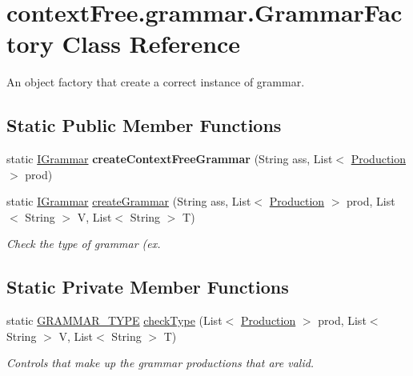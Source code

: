 \hypertarget{classcontext_free_1_1grammar_1_1_grammar_factory}{\section{context\-Free.\-grammar.\-Grammar\-Factory Class Reference}
\label{classcontext_free_1_1grammar_1_1_grammar_factory}
}


An object factory that create a correct instance of grammar.  


\subsection*{Static Public Member Functions}
\begin{DoxyCompactItemize}
\item 
\hypertarget{classcontext_free_1_1grammar_1_1_grammar_factory_a6829a8d168584b20ac594fae87de591a}{static \hyperlink{interfacecontext_free_1_1grammar_1_1_i_grammar}{I\-Grammar} {\bfseries create\-Context\-Free\-Grammar} (String ass, List$<$ \hyperlink{classcontext_free_1_1grammar_1_1_production}{Production} $>$ prod)}\label{classcontext_free_1_1grammar_1_1_grammar_factory_a6829a8d168584b20ac594fae87de591a}

\item 
static \hyperlink{interfacecontext_free_1_1grammar_1_1_i_grammar}{I\-Grammar} \hyperlink{classcontext_free_1_1grammar_1_1_grammar_factory_a25d4e5bf4a9a452efca5dd6518e16c25}{create\-Grammar} (String ass, List$<$ \hyperlink{classcontext_free_1_1grammar_1_1_production}{Production} $>$ prod, List$<$ String $>$ V, List$<$ String $>$ T)
\begin{DoxyCompactList}\small\item\em Check the type of grammar (ex. \end{DoxyCompactList}\end{DoxyCompactItemize}
\subsection*{Static Private Member Functions}
\begin{DoxyCompactItemize}
\item 
static \hyperlink{enumcontext_free_1_1grammar_1_1_g_r_a_m_m_a_r___t_y_p_e}{G\-R\-A\-M\-M\-A\-R\-\_\-\-T\-Y\-P\-E} \hyperlink{classcontext_free_1_1grammar_1_1_grammar_factory_a513482168bb15e55211bc4f04e276711}{check\-Type} (List$<$ \hyperlink{classcontext_free_1_1grammar_1_1_production}{Production} $>$ prod, List$<$ String $>$ V, List$<$ String $>$ T)
\begin{DoxyCompactList}\small\item\em Controls that make up the grammar productions that are valid. \end{DoxyCompactList}\end{DoxyCompactItemize}


